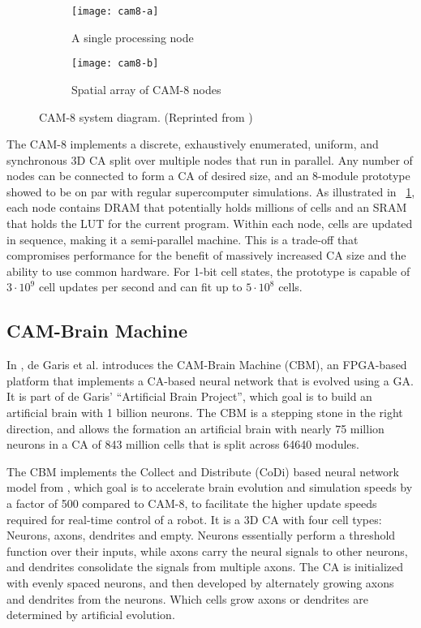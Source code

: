 \begin{figure}[!ht]
    \centering
    \begin{subfigure}{0.48\textwidth}
        \centering
        \texttt{[image: cam8-a]}
        \caption{A single processing node}
    \end{subfigure}
    \begin{subfigure}{0.48\textwidth}
        \centering
        \texttt{[image: cam8-b]}
        \caption{Spatial array of CAM-8 nodes}
    \end{subfigure}
    \caption[CAM-8 system diagram]{
        CAM-8 system diagram.
        (Reprinted from \cite{margolus1996cam8})
    }
    \label{fig:cam-8}
\end{figure}

The CAM-8 implements a discrete, exhaustively enumerated, uniform, and synchronous 3D CA split over multiple nodes that run in parallel.
Any number of nodes can be connected to form a CA of desired size, and an 8-module prototype showed to be on par with regular supercomputer simulations.
As illustrated in \figurename~\ref{fig:cam-8}, each node contains DRAM that potentially holds millions of cells and an SRAM that holds the LUT for the current program.
Within each node, cells are updated in sequence, making it a semi-parallel machine.
This is a trade-off that compromises performance for the benefit of massively increased CA size and the ability to use common hardware.
For 1-bit cell states, the prototype is capable of $3 \cdot 10^9$ cell updates per second and can fit up to $5 \cdot 10^8$ cells.

\subsection{CAM-Brain Machine}

In \cite{degaris2001cbm}, de Garis et al. introduces the CAM-Brain Machine (CBM), an FPGA-based platform that implements a CA-based neural network that is evolved using a GA.
It is part of de Garis' ``Artificial Brain Project'', which goal is to build an artificial brain with 1 billion neurons.
The CBM is a stepping stone in the right direction, and allows the formation an artificial brain with nearly 75 million neurons in a CA of 843 million cells that is split across 64640 modules.

The CBM implements the Collect and Distribute (CoDi) based neural network model from \cite{gers1998codi}, which goal is to accelerate brain evolution and simulation speeds by a factor of 500 compared to CAM-8, to facilitate the higher update speeds required for real-time control of a robot.
It is a 3D CA with four cell types: Neurons, axons, dendrites and empty.
Neurons essentially perform a threshold function over their inputs, while axons carry the neural signals to other neurons, and dendrites consolidate the signals from multiple axons.
The CA is initialized with evenly spaced neurons, and then developed by alternately growing axons and dendrites from the neurons.
Which cells grow axons or dendrites are determined by artificial evolution.

